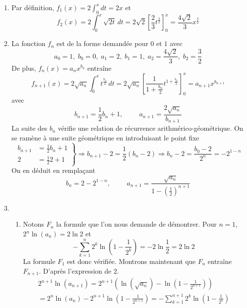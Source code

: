 \begin{enumerate}
 \item Par définition, $f_1(x)= 2\int_0^x dt = 2x$ et
\begin{displaymath}
 f_2(x) = 2\int_0^x \sqrt{2t}\,dt =2\sqrt{2}\left[\frac{2}{3}t^{\frac{3}{2}} \right]_{0}^{x}=\frac{4\sqrt{2}}{3}x^{\frac{3}{2}} 
\end{displaymath}

 \item La fonction $f_n$ est de la forme demandée pour $0$ et $1$ avec 
\begin{displaymath}
 a_0=1,\; b_0=0,\; a_1=2,\; b_1=1,\; a_2=\frac{4\sqrt{2}}{3},\; b_2=\frac{3}{2}
\end{displaymath}
De plus, $f_n(x)=a_nx^{b_n}$ entraîne
\begin{displaymath}
 f_{n+1}(x) = 2\sqrt{a_n}\int_{0}^{x}t^\frac{b_n}{2}\,dt
= 2\sqrt{a_n}\left[ \frac{1}{1+\frac{b_n}{2}}t^{1+\frac{b_n}{2}}\right]_{0}^{x} 
= a_{n+1}x^{b_{n+1}}
\end{displaymath}
avec
\begin{displaymath}
 b_{n+1} = \frac{1}{2}b_n + 1,\hspace{1cm}a_{n+1} = \frac{2\sqrt{a_n}}{b_{n+1}} 
\end{displaymath}
La suite des $b_n$ vérifie une relation de récurrence arithmérico-géométrique. On se ramène à une suite géométrique en introduisant le point fixe
\begin{displaymath}
 \left. 
\begin{aligned}
 b_{n+1} &= \frac{1}{2}b_n + 1\\ 2 &= \frac{1}{2}2 + 1
\end{aligned}
\right\rbrace \Rightarrow
b_{n+1} - 2 =\frac{1}{2}\left(b_n -2 \right)
\Rightarrow b_n -2 =\frac{b_0 -2}{2^n} =-2^{1-n}
\end{displaymath}
On en déduit en remplaçant
\begin{displaymath}
 b_n = 2-2^{1-n},\hspace{1cm} a_{n+1} =\frac{\sqrt{a_n}}{1-(\frac{1}{2})^{n+1}}
\end{displaymath}

 \item
\begin{enumerate}
 \item Notons $F_n$ la formule que l'on nous demande de démontrer.\newline
Pour $n=1$, $2^n\ln(a_n)=2\ln2$ et
\begin{displaymath}
 -\sum_{k=1}^n 2^k\ln(1-\frac{1}{2^k})=-2\ln\frac{1}{2}=2\ln 2
\end{displaymath}
La formule $F_1$ est donc vérifiée. Montrons maintenant que $F_n$ entraîne $F_{n+1}$. D'après l'expression de 2.
\begin{multline*}
 2^{n+1}\ln(a_{n+1})=2^{n+1}\left(\ln(\sqrt{a_n})-\ln(1-\frac{1}{2^{n+1}}) \right)\\
=2^n\ln(a_n)-2^{n+1}\ln(1-\frac{1}{2^{n+1}})
= -\sum_{k=1}^{n+1} 2^k\ln(1-\frac{1}{2^k})
\end{multline*}
 

\end{enumerate}
\end{enumerate}
